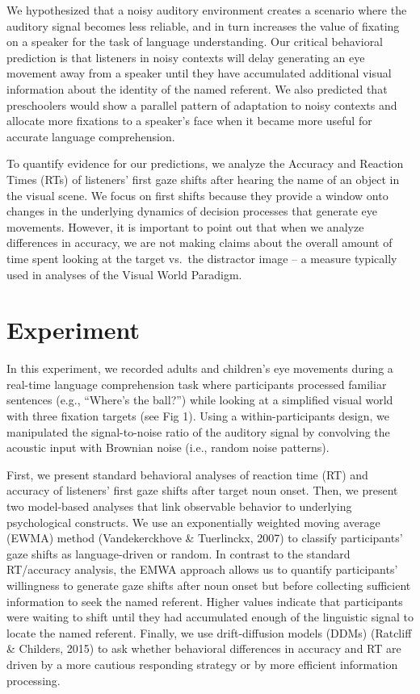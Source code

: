 \documentclass[10pt, letterpaper]{article}
\begin{document}
We hypothesized that a noisy auditory environment creates a scenario
where the auditory signal becomes less reliable, and in turn increases
the value of fixating on a speaker for the task of language
understanding. Our critical behavioral prediction is that listeners in
noisy contexts will delay generating an eye movement away from a speaker
until they have accumulated additional visual information about the
identity of the named referent. We also predicted that preschoolers
would show a parallel pattern of adaptation to noisy contexts and
allocate more fixations to a speaker's face when it became more useful
for accurate language comprehension.

To quantify evidence for our predictions, we analyze the Accuracy and
Reaction Times (RTs) of listeners' first gaze shifts after hearing the
name of an object in the visual scene. We focus on first shifts because
they provide a window onto changes in the underlying dynamics of
decision processes that generate eye movements. However, it is important
to point out that when we analyze differences in accuracy, we are not
making claims about the overall amount of time spent looking at the
target vs.~the distractor image -- a measure typically used in analyses
of the Visual World Paradigm.

\section{Experiment}\label{experiment}

In this experiment, we recorded adults and children's eye movements
during a real-time language comprehension task where participants
processed familiar sentences (e.g., ``Where's the ball?'') while looking
at a simplified visual world with three fixation targets (see Fig 1).
Using a within-participants design, we manipulated the signal-to-noise
ratio of the auditory signal by convolving the acoustic input with
Brownian noise (i.e., random noise patterns).

First, we present standard behavioral analyses of reaction time (RT) and
accuracy of listeners' first gaze shifts after target noun onset. Then,
we present two model-based analyses that link observable behavior to
underlying psychological constructs. We use an exponentially weighted
moving average (EWMA) method (Vandekerckhove \& Tuerlinckx, 2007) to
classify participants' gaze shifts as language-driven or random. In
contrast to the standard RT/accuracy analysis, the EMWA approach allows
us to quantify participants' willingness to generate gaze shifts after
noun onset but before collecting sufficient information to seek the
named referent. Higher values indicate that participants were waiting to
shift until they had accumulated enough of the linguistic signal to
locate the named referent. Finally, we use drift-diffusion models (DDMs)
(Ratcliff \& Childers, 2015) to ask whether behavioral differences in
accuracy and RT are driven by a more cautious responding strategy or by
more efficient information processing.
\end{document}
